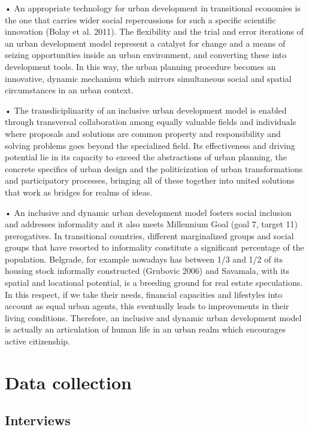 \documentclass[11pt]{report}
\begin{document}
•	An appropriate technology for urban development in transitional economies is the one that carries wider social repercussions for such a specific scientific innovation (Bolay et al. 2011). The flexibility and the trial and error iterations of an urban development model represent a catalyst for change and a means of seizing opportunities inside an urban environment, and converting these into development tools. In this way, the urban planning procedure becomes an innovative, dynamic mechanism which mirrors simultaneous social and spatial circumstances in an urban context.

•	The transdiciplinarity of an inclusive urban development model is enabled through transversal collaboration among equally valuable fields and individuals where proposals and solutions are common property and responsibility and solving problems goes beyond the specialized field. Its effectiveness and driving potential lie in its capacity to exceed the abstractions of urban planning, the concrete specifics of urban design and the politicization of urban transformations and participatory processes,  bringing all of these together  into united solutions that work as bridges for realms of ideas.

•	An inclusive and dynamic urban development model fosters social inclusion and addresses informality and it also meets Millennium Goal (goal 7, target 11) prerogatives. In transitional countries, different marginalized groups and social groups that have resorted to informality constitute a significant percentage of the population. Belgrade, for example nowadays has between 1/3 and 1/2 of its housing stock informally constructed (Grubovic 2006) and Savamala, with its spatial and locational potential, is a breeding ground for real estate speculations. In this respect, if we take their needs, financial capacities and lifestyles into account as equal urban agents, this eventually leads to improvements in their living conditions. Therefore, an inclusive and dynamic urban development model is actually an articulation of human life in an urban realm which encourages active citizenship.

\newpage
\appendix
\chapter{Data collection}

\section{Interviews}
\end{document}
